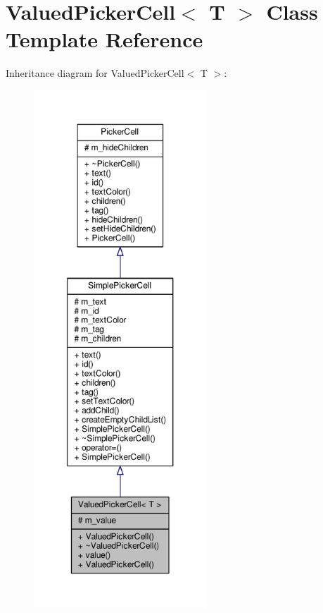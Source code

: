 \hypertarget{classValuedPickerCell}{}\section{Valued\+Picker\+Cell$<$ T $>$ Class Template Reference}
\label{classValuedPickerCell}


Inheritance diagram for Valued\+Picker\+Cell$<$ T $>$\+:
\nopagebreak
\begin{figure}[H]
\begin{center}
\leavevmode
\includegraphics[height=550pt]{df/da7/classValuedPickerCell__inherit__graph}
\end{center}
\end{figure}


